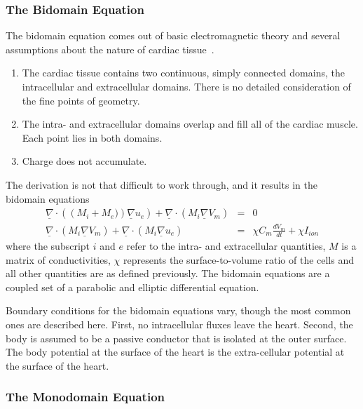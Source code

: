 \subsubsection{The Bidomain Equation}

The bidomain equation comes out of basic electromagnetic theory and several
assumptions about the nature of cardiac tissue~\cite{Tung1978,Geselowitz1983}.
\begin{enumerate}
    \item The cardiac tissue contains two continuous, simply connected domains, the intracellular and extracellular domains.
    There is no detailed consideration of the fine points of geometry.
    \item The intra- and extracellular domains overlap and fill all of the cardiac muscle. Each point lies in both domains.
    \item Charge does not accumulate.
\end{enumerate}

The derivation is not that difficult to work through, and it results in the bidomain equations
\begin{subequations}
\label{eqn:intro:math:bidom}
\begin{align}
\underline{\nabla}\cdot\left(\left(M_{i}+M_{e})\right)\underline{\nabla}u_{e}\right) + \underline{\nabla}\cdot\left( M_{i}\underline{\nabla}V_{m}\right) &=& 0
\label{eqn:intro:math:bidom1}\\
\underline{\nabla}\cdot\left(M_{i}\underline{\nabla}V_{m}\right) + \underline{\nabla}\cdot\left(M_{i}\underline{\nabla}u_{e}\right) &=& \chi C_{m}\frac{dV_{m}}{dt} + \chi{I_{ion}}
\label{eqn:intro:math:bidom2}
\end{align}
\end{subequations}
where the subscript $i$ and $e$ refer to the intra- and extracellular quantities, $M$ is a matrix of conductivities, $\chi$ represents the surface-to-volume ratio of the cells and all other quantities are as defined previously.
The bidomain equations are a coupled set of a parabolic and elliptic differential equation.

Boundary conditions for the bidomain equations vary, though the most common ones are described here.
First, no intracellular fluxes leave the heart.
Second, the body is assumed to be a passive conductor that is isolated at the outer surface.
The body potential at the surface of the heart is the extra-cellular potential at the surface of the heart.

\subsubsection{The Monodomain Equation}

